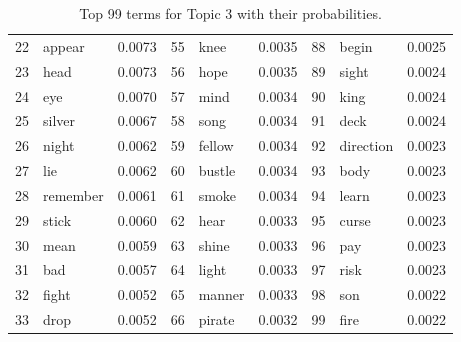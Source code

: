\begin{table}[ht]
\begin{tabular}{rlrrlrrlr}
  22 & appear & 0.0073 & 55 & knee & 0.0035 & 88 & begin & 0.0025 \\ 
  23 & head & 0.0073 & 56 & hope & 0.0035 & 89 & sight & 0.0024 \\ 
  24 & eye & 0.0070 & 57 & mind & 0.0034 & 90 & king & 0.0024 \\ 
  25 & silver & 0.0067 & 58 & song & 0.0034 & 91 & deck & 0.0024 \\ 
  26 & night & 0.0062 & 59 & fellow & 0.0034 & 92 & direction & 0.0023 \\ 
  27 & lie & 0.0062 & 60 & bustle & 0.0034 & 93 & body & 0.0023 \\ 
  28 & remember & 0.0061 & 61 & smoke & 0.0034 & 94 & learn & 0.0023 \\ 
  29 & stick & 0.0060 & 62 & hear & 0.0033 & 95 & curse & 0.0023 \\ 
  30 & mean & 0.0059 & 63 & shine & 0.0033 & 96 & pay & 0.0023 \\ 
  31 & bad & 0.0057 & 64 & light & 0.0033 & 97 & risk & 0.0023 \\ 
  32 & fight & 0.0052 & 65 & manner & 0.0033 & 98 & son & 0.0022 \\ 
  33 & drop & 0.0052 & 66 & pirate & 0.0032 & 99 & fire & 0.0022 \\ 
   \hline
\end{tabular}
\caption{\small{ Top 99 terms for Topic 3 with their probabilities.}} 
\label{topic_3_terms}
\end{table}
